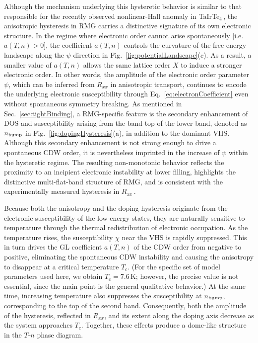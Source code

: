 \documentclass[aps,prx,article,twocolumn,amsmath,amssymb,superscriptaddress,longbibliography]{revtex4-2}
\begin{document}
Although the mechanism underlying this hysteretic behavior is similar to that responsible for the recently observed nonlinear-Hall anomaly in TaIrTe$_4$\,\cite{tang2026bistable}, the anisotropic hysteresis in RMG carries a distinctive signature of its own electronic structure. In the regime where electronic order cannot arise spontaneously [i.e.~$a(T,n)> 0$], the coefficient $a(T,n)$ controls the curvature of the free-energy landscape along the $\psi$ direction in Fig.~\ref{fig:potentialLandscape}(c). As a result, a smaller value of $a(T,n)$ allows the same lattice order $X$ to induce a stronger electronic order. In other words, the amplitude of the electronic order parameter $\psi$, which can be inferred from $R_{xx}$ in anisotropic transport, continues to encode the underlying electronic susceptibility through Eq.~\eqref{eq:electronCoefficient} even without spontaneous symmetry breaking. As mentioned in Sec.~\ref{sec:tightBinding}, a RMG-specific feature is the secondary enhancement of DOS and susceptibility arising from the band top of the lower band, denoted as $n_{\rm bump}$ in Fig.~\ref{fig:dopingHysteresis}(a), in addition to the dominant VHS. Although this secondary enhancement is not strong enough to drive a spontaneous CDW order, it is nevertheless imprinted in the increase of $\psi$ within the hysteretic regime. The resulting non-monotonic behavior reflects the proximity to an incipient electronic instability at lower filling, highlights the distinctive multi-flat-band structure of RMG, and is consistent with the experimentally measured hysteresis in $R_{xx}$\,\cite{zhao2026hysteretical}.

Because both the anisotropy and the doping hysteresis originate from the electronic susceptibility of the low-energy states, they are naturally sensitive to temperature through the thermal redistribution of electronic occupation. As the temperature rises, the susceptibility $\chi$ near the VHS is rapidly suppressed. This in turn drives the GL coefficient $a(T,n)$ of the CDW order from negative to positive, eliminating the spontaneous CDW instability and causing the anisotropy to disappear at a critical temperature $T_c$. (For the specific set of model parameters used here, we obtain $T_c = 7.6$\,K; however, the precise value is not essential, since the main point is the general qualitative behavior.) At the same time, increasing temperature also suppresses the susceptibility at $n_{\rm bump}$, corresponding to the top of the second band. Consequently, both the amplitude of the hysteresis, reflected in $R_{xx}$, and its extent along the doping axis decrease as the system approaches $T_c$. Together, these effects produce a dome-like structure in the $T$-$n$ phase diagram.
\end{document}
